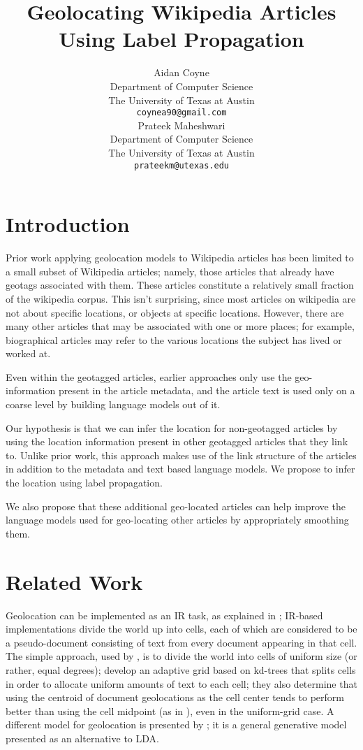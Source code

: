\documentclass[11pt]{article}
\title{Geolocating Wikipedia Articles Using Label Propagation}
\author{Aidan Coyne \\
    Department of Computer Science\\
    The University of Texas at Austin\\
  {\tt coynea90@gmail.com} \\ 
  \And
  Prateek Maheshwari\\
     Department of Computer Science\\
    The University of Texas at Austin\\
  {\tt prateekm@utexas.edu}}
\date{}
\begin{document}
\maketitle

\section{Introduction}
Prior work applying geolocation models to Wikipedia articles 
has been limited to a small subset of Wikipedia articles; 
namely, those articles that already have geotags associated with them. 
These articles constitute a relatively small fraction %
of the wikipedia corpus. This isn't surprising, since most articles on wikipedia are not about specific locations, or objects at specific locations.
However, there are many other articles that may be associated with one or more places; 
for example, biographical articles may refer to the various locations the subject has lived or worked at.

Even within the geotagged articles, earlier approaches only use the geo-information present in the article metadata, and the article text is used only on a coarse level %
by building language models out of it.

Our hypothesis is that we can infer the location for non-geotagged articles 
by using the location information present in other geotagged articles that they link to. 
Unlike prior work, this approach makes use of the link structure of the articles in addition to the metadata and text based language models. 
We propose to infer the location using label propagation.

We also propose that these additional geo-located articles can help improve the language models used for geo-locating other articles by appropriately smoothing them.

\section{Related Work}
Geolocation can be implemented as an IR task, as explained in \cite{skiles:12};
IR-based implementations divide the world up into cells, each
of which are considered to be a pseudo-document consisting of text from every
document appearing in that cell.
The simple approach, used by \cite{wing-baldridge:11}, is to divide the world
into cells of uniform size (or rather, equal degrees);
\cite{rolleretal:12} develop an adaptive grid based on kd-trees that splits cells in order to
allocate uniform amounts of text to each cell; 
they also determine that using the centroid of document geolocations as the
cell center tends to perform better than using the cell midpoint (as in
\cite{wing-baldridge:11}), even in the uniform-grid case.
A different model for geolocation is presented by \cite{eisensteinetal:11}; it
is a general generative model presented as an alternative to LDA.
\end{document}
